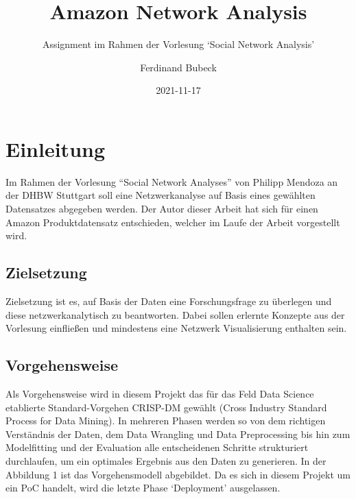 \documentclass[
  12 pt,
]{article}
\title{Amazon Network Analysis}
\subtitle{Assignment im Rahmen der Vorlesung `Social Network Analysis'}
\author{Ferdinand Bubeck}
\date{2021-11-17}
\begin{document}
\maketitle

\renewcommand*\contentsname{Inhaltsverzeichnis}
{
\setcounter{tocdepth}{3}
\tableofcontents
}
\newpage

\hypertarget{einleitung}{%
\section{Einleitung}\label{einleitung}}

Im Rahmen der Vorlesung ``Social Network Analyses'' von Philipp Mendoza
an der DHBW Stuttgart soll eine Netzwerkanalyse auf Basis eines
gewählten Datensatzes abgegeben werden. Der Autor dieser Arbeit hat sich
für einen Amazon Produktdatensatz entschieden, welcher im Laufe der
Arbeit vorgestellt wird.

\hypertarget{zielsetzung}{%
\subsection{Zielsetzung}\label{zielsetzung}}

Zielsetzung ist es, auf Basis der Daten eine Forschungsfrage zu
überlegen und diese netzwerkanalytisch zu beantworten. Dabei sollen
erlernte Konzepte aus der Vorlesung einfließen und mindestens eine
Netzwerk Visualisierung enthalten sein.

\hypertarget{vorgehensweise}{%
\subsection{Vorgehensweise}\label{vorgehensweise}}

Als Vorgehensweise wird in diesem Projekt das für das Feld Data Science
etablierte Standard-Vorgehen CRISP-DM gewählt (Cross Industry Standard
Process for Data Mining). In mehreren Phasen werden so von dem richtigen
Verständnis der Daten, dem Data Wrangling und Data Preprocessing bis hin
zum Modelfitting und der Evaluation alle entscheidenen Schritte
strukturiert durchlaufen, um ein optimales Ergebnis aus den Daten zu
generieren. In der Abbildung 1 ist das Vorgehensmodell abgebildet. Da es
sich in diesem Projekt um ein PoC handelt, wird die letzte Phase
`Deployment' ausgelassen.
\end{document}
